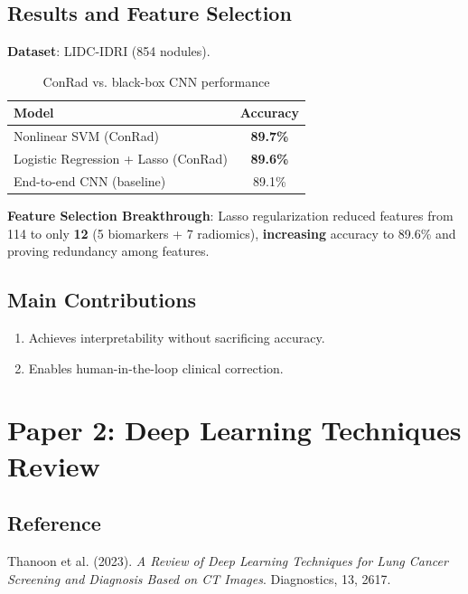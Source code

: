 \documentclass[10pt,a4paper]{article}
\begin{document}
\subsection{Results and Feature Selection}
\textbf{Dataset}: LIDC-IDRI (854 nodules).
\vspace{-0.2cm}

\begin{table}[h]
    \centering
    \begin{tabular}{lc}
        \toprule
        \textbf{Model} & \textbf{Accuracy} \\
        \midrule
        Nonlinear SVM (ConRad) & \textbf{89.7\%} \\
        Logistic Regression + Lasso (ConRad) & \textbf{89.6\%} \\
        End-to-end CNN (baseline) & 89.1\% \\
        \bottomrule
    \end{tabular}
    \caption{ConRad vs. black-box CNN performance}
\end{table}
\vspace{-0.3cm}

\textbf{Feature Selection Breakthrough}: Lasso regularization reduced features from 114 to only \textbf{12} (5 biomarkers + 7 radiomics), \textbf{increasing} accuracy to 89.6\% and proving redundancy among features.
\vspace{-0.2cm}

\subsection{Main Contributions}
\begin{enumerate}[noitemsep, topsep=0pt, parsep=0pt, leftmargin=1.5em]
    \item Achieves interpretability without sacrificing accuracy.
    \item Enables human-in-the-loop clinical correction.
\end{enumerate}

\section{Paper 2: Deep Learning Techniques Review}

\subsection{Reference}
Thanoon et al. (2023). \textit{A Review of Deep Learning Techniques for Lung Cancer Screening and Diagnosis Based on CT Images}. Diagnostics, 13, 2617.
\vspace{-0.2cm}
\end{document}
